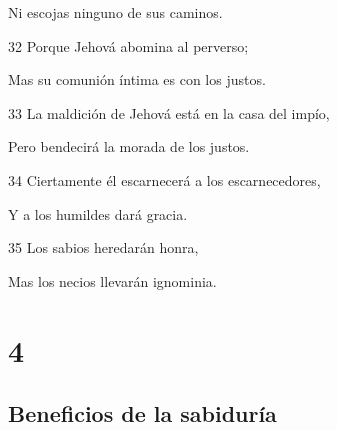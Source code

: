 \par Ni escojas ninguno de sus caminos.
\par 32 Porque Jehová abomina al perverso;
\par Mas su comunión íntima es con los justos.
\par 33 La maldición de Jehová está en la casa del impío,
\par Pero bendecirá la morada de los justos.
\par 34 Ciertamente él escarnecerá a los escarnecedores,
\par Y a los humildes dará gracia. 
\par 35 Los sabios heredarán honra,
\par Mas los necios llevarán ignominia.

\chapter{4}

\section*{Beneficios de la sabiduría}


